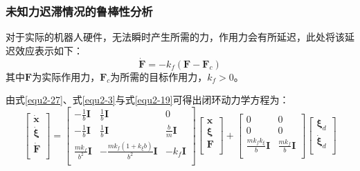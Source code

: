         \subsubsection{未知力迟滞情况的鲁棒性分析}
            对于实际的机器人硬件，无法瞬时产生所需的力，作用力会有所延迟，此处将该延迟效应表示如下：
            \begin{equation}
                \boldsymbol{\dot{F}}=-k_f\left( \boldsymbol{F}-\boldsymbol{F}_c \right)
                \label{equ2-27}
            \end{equation}
            其中$\boldsymbol{F}$为实际作用力，$\boldsymbol{F}_c$为所需的目标作用力，$k_f>0$。

            由式\eqref{equ2-27}、式\eqref{equ2-3}与式\eqref{equ2-19}可得出闭环动力学方程为：
            \begin{equation}
                \left[ \begin{array}{c}
                    \boldsymbol{\dot{x}}\\
                    \boldsymbol{\dot{\xi}}\\
                    \boldsymbol{\dot{F}}\\
                \end{array} \right] =\left[ \begin{matrix}
                    -\frac{1}{b}\boldsymbol{I}&		\frac{1}{b}\boldsymbol{I}&		0\\
                    -\frac{1}{b}\boldsymbol{I}&		\frac{1}{b}\boldsymbol{I}&		\frac{b}{m}\boldsymbol{I}\\
                    \frac{mk_f}{b^2}\boldsymbol{I}&		-\frac{mk_f\left( 1+k_{\xi}b \right)}{b^2}\boldsymbol{I}&		-k_f\boldsymbol{I}\\
                \end{matrix} \right] \left[ \begin{array}{c}
                    \boldsymbol{x}\\
                    \boldsymbol{\xi }\\
                    \boldsymbol{F}\\
                \end{array} \right] +\left[ \begin{matrix}
                    0&		0\\
                    0&		0\\
                    \frac{mk_fk_{\xi}}{b}\boldsymbol{I}&		\frac{mk_f}{b}\boldsymbol{I}\\
                \end{matrix} \right] \left[ \begin{array}{c}
                    \boldsymbol{\xi }_d\\
                    \boldsymbol{\dot{\xi}}_d\\
                \end{array} \right]
                \label{equ2-28}
            \end{equation}
